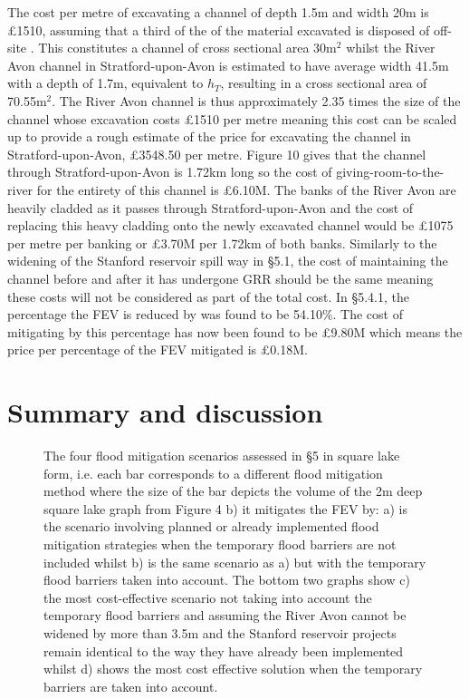 \documentclass[11pt,a4paper]{article}
\begin{document}
\noindent The cost per metre of excavating a channel of depth 1.5m and width 20m is \pounds1510, assuming that a third of the of the material excavated is disposed of off-site \cite{cost1}. This constitutes a channel of cross sectional area 30m$^2$ whilst the River Avon channel in Stratford-upon-Avon is estimated to have average width 41.5m \cite{maps} with a depth of 1.7m, equivalent to $h_T$, resulting in a cross sectional area of 70.55m$^2$. The River Avon channel is thus approximately 2.35 times the size of the channel whose excavation costs \pounds1510 per metre meaning this cost can be scaled up to provide a rough estimate of the price for excavating the channel in Stratford-upon-Avon, \pounds3548.50 per metre. Figure 10 gives that the channel through Stratford-upon-Avon is 1.72km long so the cost of giving-room-to-the-river for the entirety of this channel is \pounds6.10M. The banks of the River Avon are heavily cladded as it passes through Stratford-upon-Avon and the cost of replacing this heavy cladding onto the newly excavated channel would be \pounds1075 per metre per banking or \pounds3.70M per 1.72km of both banks. Similarly to the widening of the Stanford reservoir spill way in \S5.1, the cost of maintaining the channel before and after it has undergone GRR should be the same meaning these costs will not be considered as part of the total cost. In \S 5.4.1, the percentage the FEV is reduced by was found to be 54.10\%. The cost of mitigating by this percentage has now been found to be \pounds9.80M which means the price per percentage of the FEV mitigated is \pounds0.18M.

\section{Summary and discussion}
\begin{figure}[ht!]
\hfill
{}
\caption{The four flood mitigation scenarios assessed in \S 5 in square lake form, i.e. each bar corresponds to a different flood mitigation method where the size of the bar depicts the volume of the 2m deep square lake graph from Figure 4 b) it mitigates the FEV by: a) is the scenario involving planned or already implemented flood mitigation strategies when the temporary flood barriers are not included whilst b) is the same scenario as a) but with the temporary flood barriers taken into account. The bottom two graphs show c) the most cost-effective scenario not taking into account the temporary flood barriers and assuming the River Avon cannot be widened by more than 3.5m and the Stanford reservoir projects remain identical to the way they have already been implemented whilst d) shows the most cost effective solution when the temporary barriers are taken into account.}
\end{figure}
\end{document}
